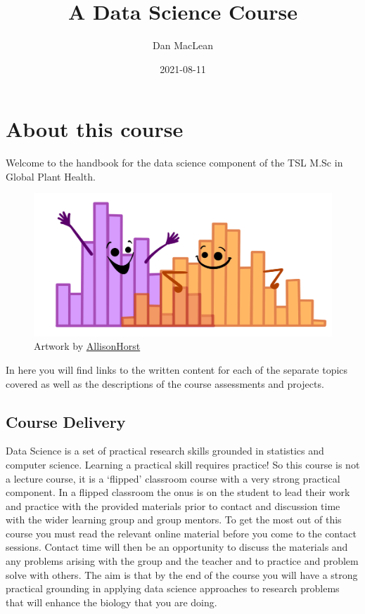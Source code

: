 \documentclass[
]{book}
\title{A Data Science Course}
\author{Dan MacLean}
\date{2021-08-11}
\begin{document}
\maketitle

{
\setcounter{tocdepth}{1}
\tableofcontents
}
\hypertarget{about-this-course}{%
\chapter{About this course}\label{about-this-course}}

Welcome to the handbook for the data science component of the TSL M.Sc in Global Plant Health.

\begin{figure}
\centering
\includegraphics{ex_1.png}
\caption{\label{fig:unnamed-chunk-1}Artwork by \href{https://github.com/allisonhorst}{AllisonHorst}}
\end{figure}

In here you will find links to the written content for each of the separate topics covered as well as the descriptions of the course assessments and projects.

\hypertarget{course-delivery}{%
\section{Course Delivery}\label{course-delivery}}

Data Science is a set of practical research skills grounded in statistics and computer science. Learning a practical skill requires practice! So this course is not a lecture course, it is a `flipped' classroom course with a very strong practical component. In a flipped classroom the onus is on the student to lead their work and practice with the provided materials prior to contact and discussion time with the wider learning group and group mentors. To get the most out of this course you must read the relevant online material before you come to the contact sessions. Contact time will then be an opportunity to discuss the materials and any problems arising with the group and the teacher and to practice and problem solve with others. The aim is that by the end of the course you will have a strong practical grounding in applying data science approaches to research problems that will enhance the biology that you are doing.
\end{document}
